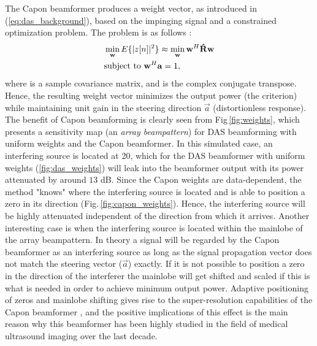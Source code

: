 The Capon beamformer produces a weight vector, as introduced in (\ref{eq:das_background}), based on the impinging signal and a constrained optimization problem. The problem is as follows \cite{Capon1969}:
\begin{align}
&\min_{\mathbf{w}} E\{|z[n]|^2\} \approx \min_{\mathbf{w}} \mathbf{w}^H \mathbf{\hat{R}} \mathbf{w} \label{eq:capon_optimization_criteria_background} \\
&\text{subject to } \mathbf{w}^H\mathbf{a} = 1,\notag
\end{align}
where  is a sample covariance matrix, and  is the complex conjugate transpose. Hence, the resulting weight vector minimizes the output power (the criterion) while maintaining unit gain in the steering direction $\vec{a}$ (distortionless response). The benefit of Capon beamforming is clearly seen from Fig\,\ref{fig:weights}, which presents a sensitivity map (an \textit{array beampattern}) for DAS beamforming with uniform weights and the Capon beamformer. In this simulated case, an interfering source is located at 20\degree{}, which for the DAS beamformer with uniform weights (\ref{fig:das_weights}) will leak into the beamformer output with its power attenuated by around $13$ dB. Since the Capon weights are data-dependent, the method "knows" where the interfering source is located and is able to position a zero in its direction (Fig.\,\ref{fig:capon_weights}). Hence, the interfering source will be highly attenuated independent of the direction from which it arrives. Another interesting case is when the interfering source is located within the mainlobe of the array beampattern. In theory a signal will be regarded by the Capon beamformer as an interfering source as long as the signal propagation vector does not match the steering vector ($\vec{a}$) exactly. If it is not possible to position a zero in the direction of the interferer the mainlobe will get shifted and scaled if this is what is needed in order to achieve minimum output power. Adaptive positioning of zeros and mainlobe shifting gives rise to the super-resolution capabilities of the Capon beamformer \cite{Synnevag2007}, and the positive implications of this effect \cite{Synnevag2009} is the main reason why this beamformer has been highly studied in the field of medical ultrasound imaging over the last decade.

